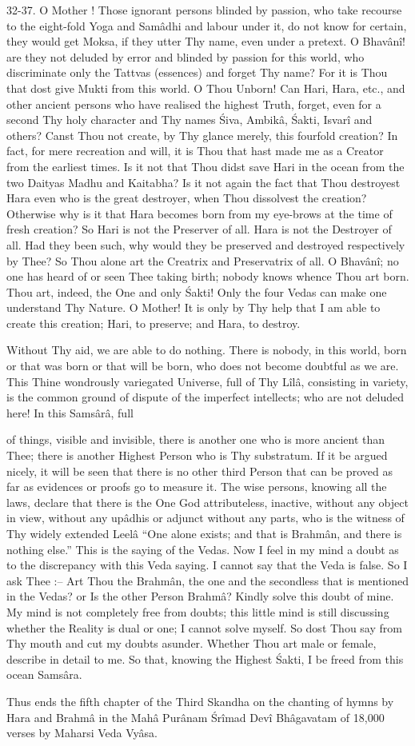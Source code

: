 32-37. O Mother ! Those ignorant persons blinded by passion, who take recourse to the eight-fold Yoga and Sam\^adhi and labour under it, do not know for certain, they would get Moksa, if they utter Thy name, even under a pretext. O Bhav\^an\^i! are they not deluded by error and blinded by passion for this world, who discriminate only the Tattvas (essences) and forget Thy name? For it is Thou that dost give Mukti from this world. O Thou Unborn! Can Hari, Hara, etc., and other ancient persons who have realised the highest Truth, forget, even for a second Thy holy character and Thy names \'Siva, Ambik\^a, \'Sakti, Isvar\^i and others? Canst Thou not create, by Thy glance merely, this fourfold creation? In fact, for mere recreation and will, it is Thou that hast made me as a Creator from the earliest times. Is it not that Thou didst save Hari in the ocean from the two Daityas Madhu and Kaitabha? Is it not again the fact that Thou destroyest Hara even who is the great destroyer, when Thou dissolvest the creation? Otherwise why is it that Hara becomes born from my eye-brows at the time of fresh creation? So Hari is not the Preserver of all. Hara is not the Destroyer of all. Had they been such, why would they be preserved and destroyed respectively by Thee? So Thou alone art the Creatrix and Preservatrix of all. O Bhav\^an\^i; no one has heard of or seen Thee taking birth; nobody knows whence Thou art born. Thou art, indeed, the One and only \'Sakti! Only the four Vedas can make one understand Thy Nature. O Mother! It is only by Thy help that I am able to create this creation; Hari, to preserve; and Hara, to destroy.

Without Thy aid, we are able to do nothing. There is nobody, in this world, born or that was born or that will be born, who does not become doubtful as we are. This Thine wondrously variegated Universe, full of Thy L\^il\^a, consisting in variety, is the common ground of dispute of the imperfect intellects; who are not deluded here! In this Sams\^ar\^a, full

of things, visible and invisible, there is another one who is more ancient than Thee; there is another Highest Person who is Thy substratum. If it be argued nicely, it will be seen that there is no other third Person that can be proved as far as evidences or proofs go to measure it. The wise persons, knowing all the laws, declare that there is the One God attributeless, inactive, without any object in view, without any up\^adhis or adjunct without any parts, who is the witness of Thy widely extended Leel\^a ``One alone exists; and that is Brahm\^an, and there is nothing else.'' This is the saying of the Vedas. Now I feel in my mind a doubt as to the discrepancy with this Veda saying. I cannot say that the Veda is false. So I ask Thee :-- Art Thou the Brahm\^an, the one and the secondless that is mentioned in the Vedas? or Is the other Person Brahm\^a? Kindly solve this doubt of mine. My mind is not completely free from doubts; this little mind is still discussing whether the Reality is dual or one; I cannot solve myself. So dost Thou say from Thy mouth and cut my doubts asunder. Whether Thou art male or female, describe in detail to me. So that, knowing the Highest \'Sakti, I be freed from this ocean Sams\^ara.

Thus ends the fifth chapter of the Third Skandha on the chanting of hymns by Hara and Brahm\^a in the Mah\^a Pur\^anam \'Sr\^imad Dev\^i Bh\^agavatam of 18,000 verses by Maharsi Veda Vy\^asa.